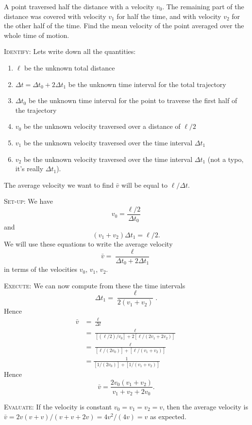 \begin{xca}
A point traversed half the distance with a velocity $v_{0}$. The
remaining part of the distance was covered with velocity $v_{1}$ for
half the time, and with velocity $v_{2}$ for the other half of the
time. Find the mean velocity of the point averaged over the whole time
of motion.
\end{xca}

\begin{soln}
\textsc{Identify:} Lets write down all the quantities:
\begin{enumerate}
\item $\ell$ be the unknown total distance
\item $\Delta t = \Delta t_{0} + 2\Delta t_{1}$ be the unknown time interval for the total trajectory
\item $\Delta t_{0}$ be the unknown time interval for the point to
traverse the first half of the trajectory
\item $v_{0}$ be the unknown velocity traversed over a distance of $\ell/2$
\item $v_{1}$ be the unknown velocity traversed over the time interval $\Delta t_{1}$
\item $v_{2}$ be the unknown velocity traversed over the time interval
$\Delta t_{1}$ (not a typo, it's really $\Delta t_{1}$).
\end{enumerate}
The average velocity we want to find $\bar{v}$ will be equal to $\ell/\Delta t$.

\textsc{Set-up:} We have
\begin{equation}
   v_{0} = \frac{\ell/2}{\Delta t_{0}}
\end{equation}
and
\begin{equation}
    (v_{1} + v_{2})\Delta t_{1} = \ell/2.
\end{equation}
We will use these equations to write the average velocity
\begin{equation}
    \bar{v} = \frac{\ell}{\Delta t_{0} + 2\Delta t_{1}}
\end{equation}
in terms of the velocities $v_{0}$, $v_{1}$, $v_{2}$.

\textsc{Execute:} We can now compute from these the time intervals
\begin{equation}
\Delta t_{1} = \frac{\ell}{2(v_{1}+v_{2})}.
\end{equation}
Hence
\begin{subequations}
\begin{align}
\bar{v} &= \frac{\ell}{\Delta t}\\
&= \frac{\ell}{[(\ell/2)/v_{0}] + 2[\ell/(2v_{1}+2v_{2})]}\\
&= \frac{\ell}{[\ell/(2v_{0})] + [\ell/(v_{1}+v_{2})]}\\
&= \frac{1}{[1/(2v_{0})] + [1/(v_{1}+v_{2})]}
\end{align}
\end{subequations}
Hence
\begin{equation}
\bar{v} = \frac{2v_{0}(v_{1} + v_{2})}{v_{1} + v_{2} + 2v_{0}}.
\end{equation}

\textsc{Evaluate:} If the velocity is constant $v_{0}=v_{1}=v_{2}=v$,
then the average velocity is $\bar{v}=2v(v+v)/(v + v + 2v)=4v^{2}/(4v)=v$ as expected.
\end{soln}